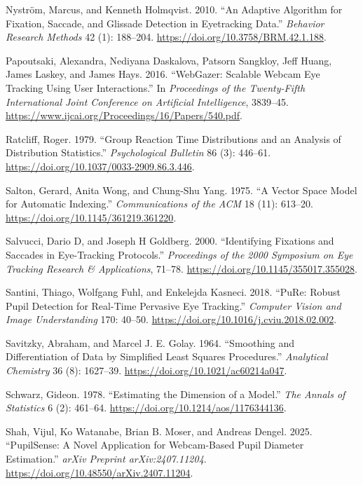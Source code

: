 \documentclass[
]{article}
\newlength{\cslhangindent}
\newenvironment{CSLReferences}[2] %
 {\begin{list}{}{%
  \setlength{\itemindent}{0pt}
  \setlength{\leftmargin}{0pt}
  \setlength{\parsep}{0pt}
  \ifodd #1
   \setlength{\leftmargin}{\cslhangindent}
   \setlength{\itemindent}{-1\cslhangindent}
  \fi
  \setlength{\itemsep}{#2\baselineskip}}}
 {\end{list}}
\begin{document}
\begin{CSLReferences}{1}{0}
Nyström, Marcus, and Kenneth Holmqvist. 2010. {``An Adaptive Algorithm
for Fixation, Saccade, and Glissade Detection in Eyetracking Data.''}
\emph{Behavior Research Methods} 42 (1): 188--204.
\url{https://doi.org/10.3758/BRM.42.1.188}.

Papoutsaki, Alexandra, Nediyana Daskalova, Patsorn Sangkloy, Jeff Huang,
James Laskey, and James Hays. 2016. {``WebGazer: Scalable Webcam Eye
Tracking Using User Interactions.''} In \emph{Proceedings of the
Twenty-Fifth International Joint Conference on Artificial Intelligence},
3839--45. \url{https://www.ijcai.org/Proceedings/16/Papers/540.pdf}.

Ratcliff, Roger. 1979. {``Group Reaction Time Distributions and an
Analysis of Distribution Statistics.''} \emph{Psychological Bulletin} 86
(3): 446--61. \url{https://doi.org/10.1037/0033-2909.86.3.446}.

Salton, Gerard, Anita Wong, and Chung-Shu Yang. 1975. {``A Vector Space
Model for Automatic Indexing.''} \emph{Communications of the ACM} 18
(11): 613--20. \url{https://doi.org/10.1145/361219.361220}.

Salvucci, Dario D, and Joseph H Goldberg. 2000. {``Identifying Fixations
and Saccades in Eye-Tracking Protocols.''} \emph{Proceedings of the 2000
Symposium on Eye Tracking Research \& Applications}, 71--78.
\url{https://doi.org/10.1145/355017.355028}.

Santini, Thiago, Wolfgang Fuhl, and Enkelejda Kasneci. 2018. {``PuRe:
Robust Pupil Detection for Real-Time Pervasive Eye Tracking.''}
\emph{Computer Vision and Image Understanding} 170: 40--50.
\url{https://doi.org/10.1016/j.cviu.2018.02.002}.

Savitzky, Abraham, and Marcel J. E. Golay. 1964. {``Smoothing and
Differentiation of Data by Simplified Least Squares Procedures.''}
\emph{Analytical Chemistry} 36 (8): 1627--39.
\url{https://doi.org/10.1021/ac60214a047}.

Schwarz, Gideon. 1978. {``Estimating the Dimension of a Model.''}
\emph{The Annals of Statistics} 6 (2): 461--64.
\url{https://doi.org/10.1214/aos/1176344136}.

Shah, Vijul, Ko Watanabe, Brian B. Moser, and Andreas Dengel. 2025.
{``PupilSense: A Novel Application for Webcam-Based Pupil Diameter
Estimation.''} \emph{arXiv Preprint arXiv:2407.11204}.
\url{https://doi.org/10.48550/arXiv.2407.11204}.


\end{CSLReferences}
\end{document}
